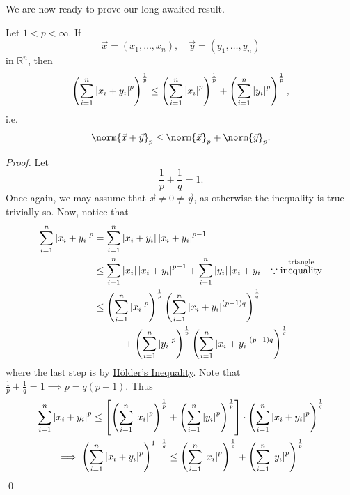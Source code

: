 \documentclass[notoc,notitlepage]{tufte-book}
\begin{document}
We are now ready to prove our long-awaited result.

\begin{thm}\label{thm:minkowshi_s_inequality}
  Let $1 < p < \infty$. If
  \begin{equation*}
    \vec{x} = ( x_1, \ldots, x_n ), \quad \vec{y} = ( y_1, \ldots, y_n )
  \end{equation*}
  in $\mathbb{R}^n$, then
  \begin{equation*}
    \left( \sum_{i=1}^{n} \left|x_i + y_i\right|^p \right)^\frac{1}{p} \leq \left( \sum_{i=1}^{n} \left|x_i\right|^p \right)^\frac{1}{p} + \left( \sum_{i=1}^{n} \left|y_i\right|^p \right)^\frac{1}{p},
  \end{equation*}
  i.e.
  \begin{equation*}
    \norm{\vec{x} + \vec{y}}_p \leq \norm{\vec{x}}_p + \norm{\vec{y}}_p.
  \end{equation*}
\end{thm}

\begin{proof}
  Let
  \begin{equation*}
    \frac{1}{p} + \frac{1}{q} = 1.
  \end{equation*}
  Once again, we may assume that $\vec{x} \neq 0 \neq \vec{y}$, as otherwise the inequality is true trivially so. Now, notice that
  \begin{align*}
    \sum_{i=1}^{n} \left|x_i + y_i\right|^p &= \sum_{i=1}^{n} \left|x_i + y_i\right| \left|x_i + y_i\right|^{p - 1} \\
                                     &\leq \sum_{i=1}^{n} \left|x_i\right| \left|x_i + y_i\right|^{p - 1} + \sum_{i=1}^{n} \left|y_i\right|\left|x_i + y_i\right| \enspace \because \overset{\text{triangle}}{\text{inequality}} \\
                                     &\leq \left( \sum_{i=1}^{n} \left|x_i\right|^p \right)^\frac{1}{p} \left( \sum_{i=1}^{n} \left|x_i + y_i\right|^{(p - 1)q} \right)^\frac{1}{q} \\
                                     & \qquad\quad + \left( \sum_{i=1}^{n} \left|y_i\right|^p \right)^\frac{1}{p} \left( \sum_{i=1}^{n} \left|x_i + y_i\right|^{(p - 1)q} \right)^\frac{1}{q}
  \end{align*}
  where the last step is by \hyperref[thm:holder_s_inequality]{H\"{o}lder's Inequality}. Note that $\frac{1}{p} + \frac{1}{q} = 1 \implies p = q(p - 1)$. Thus
  \begin{gather*}
    \sum_{i=1}^{n} \left|x_i + y_i\right|^p \leq \left[ \left( \sum_{i=1}^{n} \left|x_i\right|^p \right)^\frac{1}{p} + \left( \sum_{i=1}^{n} \left|y_i\right|^p \right)^{\frac{1}{p}} \right] \cdot \left( \sum_{i=1}^{n} \left|x_i + y_i\right|^p \right)^\frac{1}{q} \\
    \implies \left( \sum_{i=1}^{n} \left|x_i + y_i\right|^p \right)^{1 - \frac{1}{q}} \leq \left( \sum_{i=1}^{n} \left|x_i\right|^p \right)^\frac{1}{p} + \left( \sum_{i=1}^{n} \left|y_i\right|^p \right)^\frac{1}{p}
  \end{gather*}\qed
\end{proof}
\end{document}
